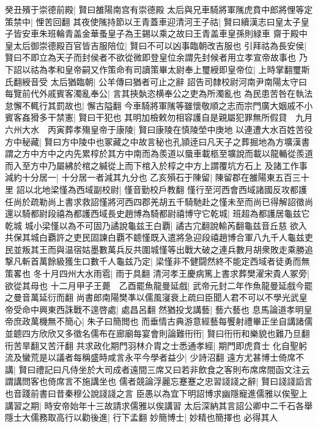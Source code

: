 癸丑殯于崇德前殿|{
	賢曰雒陽南宫有崇德殿}
太后與兄車騎將軍隲虎賁中郎將悝等定策禁中|{
	悝苦回翻}
其夜使隲持節以王青蓋車迎清河王子祜|{
	賢曰續漢志曰皇太子皇子皆安車朱班輪青盖金華蚤皇子為王錫以乘之故曰王青盖車皇孫則緑車}
齋于殿中皇太后御崇德殿百官皆吉服陪位|{
	賢曰不可以凶事臨朝改吉服也}
引拜祜為長安侯|{
	賢曰不即立為天子而封侯者不欲從微即登皇位余謂先封候者用立孝宣帝故事也}
乃下詔以祜為孝和皇帝嗣又作策命有司讀策畢太尉奉上璽綬即皇帝位|{
	上時掌翻璽斯氏翻綬音受}
太后猶臨朝|{
	公羊傳曰猶者可止之辭}
詔告司隸校尉河南尹南陽太守曰每覽前代外戚賓客濁亂奉公|{
	言其挾埶恣横奉公之吏為所濁亂也}
為民患苦咎在執法怠懈不輒行其罰故也|{
	懈古隘翻}
今車騎將軍隲等雖懷敬順之志而宗門廣大姻戚不小賓客姦猾多干禁憲|{
	賢曰干犯也}
其明加檢敕勿相容護自是親屬犯罪無所假貸　九月六州大水　丙寅葬孝殤皇帝于康陵|{
	賢曰康陵在慎陵塋中庚地}
以連遭大水百姓苦役方中秘藏|{
	賢曰方中陵中也冢藏之中故言秘也孔頴逹曰凡天子之葬掘地為方壙漢書謂之方中方中之内先累椁於其方中南而為羨道以蜃車載柩至壙說而載以龍輴從羨道而入至方中乃屬紼於棺之緘從上而下棺入於椁之中方上謂覆坑方石上}
及諸工作事減約十分居一|{
	十分居一者減其九分也}
乙亥殞石于陳留|{
	陳留郡在雒陽東五百三十里}
詔以北地梁慬為西域副校尉|{
	慬音勤校戶教翻}
慬行至河西會西域諸國反攻都護任尚於疏勒尚上書求救詔慬將河西四郡羌胡五千騎馳赴之慬未至而尚已得解詔徵尚還以騎都尉段禧為都護西域長史趙博為騎都尉禧博守它乾城|{
	班超為都護居龜兹它乾城}
城小梁慬以為不可固乃譎說龜兹王白覇|{
	譎古宂翻說輸芮翻龜兹音丘慈}
欲入共保其城白覇許之吏民固諫白覇不聼慬既入遣將急迎段禧趙博合軍八九千人龜兹吏民並叛其王而與温宿姑墨數萬兵反共圍城慬等出戰大破之連兵數月胡衆敗走乘勝追撃凡斬首萬餘級獲生口數千人龜兹乃定|{
	梁慬非不健闘然終不能定西域者徒勇而無策畧也}
冬十月四州大水雨雹|{
	雨于具翻}
清河孝王慶病篤上書求葬樊濯宋貴人冢旁|{
	欲從其母也}
十二月甲子王薨　乙酉罷魚龍曼延戲|{
	武帝元封二年作魚龍曼延戲今罷之曼音萬延衍而翻}
尚書郎南陽樊凖以儒風寖衰上疏曰臣聞人君不可以不學光武皇帝受命中興東西誅戰不遑啓處|{
	處昌呂翻}
然猶投戈講藝|{
	藝六藝也}
息馬論道孝明皇帝庶政萬機無不簡心|{
	朱子曰簡閲也}
而垂情古典游意經藝每饗射禮畢正坐自講諸儒並聼四方欣欣又多徵名儒布在廊廟每宴會則論難衎衎|{
	賢曰衎衎和樂貌也難乃旦翻衎苦旱翻又苦汗翻}
共求政化期門羽林介胄之士悉通孝經|{
	期門即虎賁士}
化自聖躬流及蠻荒是以議者每稱盛時咸言永平今學者益少|{
	少詩沼翻}
遠方尤甚博士倚席不講|{
	賢曰禮記曰凡侍坐於大司成者遠間三席又曰若非飲食之客則布席席間函文注云謂講問客也倚席言不施講坐也}
儒者競論浮麗忘蹇蹇之忠習諓諓之辭|{
	賢曰諓諓謟言也音踐前書曰昔秦穆公說諓諓之言}
臣愚以為宜下明詔博求幽隱寵進儒雅以俟聖上講習之期|{
	時安帝始年十三故請求儒雅以俟講習}
太后深納其言詔公卿中二千石各舉隱士大儒務取高行以勸後進|{
	行下孟翻}
妙簡博士|{
	妙精也簡擇也}
必得其人

